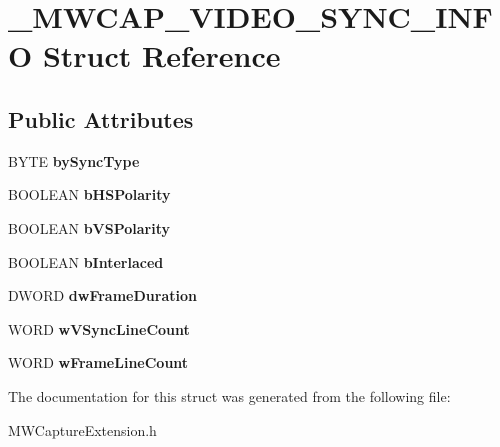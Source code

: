 \hypertarget{struct__MWCAP__VIDEO__SYNC__INFO}{\section{\-\_\-\-M\-W\-C\-A\-P\-\_\-\-V\-I\-D\-E\-O\-\_\-\-S\-Y\-N\-C\-\_\-\-I\-N\-F\-O Struct Reference}
\label{struct__MWCAP__VIDEO__SYNC__INFO}
}
\subsection*{Public Attributes}
\begin{DoxyCompactItemize}
\item 
\hypertarget{struct__MWCAP__VIDEO__SYNC__INFO_a05fc013c3622fb946e5e0eea1f09af20}{B\-Y\-T\-E {\bfseries by\-Sync\-Type}}\label{struct__MWCAP__VIDEO__SYNC__INFO_a05fc013c3622fb946e5e0eea1f09af20}

\item 
\hypertarget{struct__MWCAP__VIDEO__SYNC__INFO_ae516ba66555c4a0aae153dee463a2800}{B\-O\-O\-L\-E\-A\-N {\bfseries b\-H\-S\-Polarity}}\label{struct__MWCAP__VIDEO__SYNC__INFO_ae516ba66555c4a0aae153dee463a2800}

\item 
\hypertarget{struct__MWCAP__VIDEO__SYNC__INFO_a3ed08059458408c8770cb0470eecd0d7}{B\-O\-O\-L\-E\-A\-N {\bfseries b\-V\-S\-Polarity}}\label{struct__MWCAP__VIDEO__SYNC__INFO_a3ed08059458408c8770cb0470eecd0d7}

\item 
\hypertarget{struct__MWCAP__VIDEO__SYNC__INFO_a46d5e9f06af8f2b5c324e8c21becc6bf}{B\-O\-O\-L\-E\-A\-N {\bfseries b\-Interlaced}}\label{struct__MWCAP__VIDEO__SYNC__INFO_a46d5e9f06af8f2b5c324e8c21becc6bf}

\item 
\hypertarget{struct__MWCAP__VIDEO__SYNC__INFO_adc5d2cdbbe9ae8cfd8a1c973cbde6a6c}{D\-W\-O\-R\-D {\bfseries dw\-Frame\-Duration}}\label{struct__MWCAP__VIDEO__SYNC__INFO_adc5d2cdbbe9ae8cfd8a1c973cbde6a6c}

\item 
\hypertarget{struct__MWCAP__VIDEO__SYNC__INFO_a828e48943521d132cd3ff7ff5034c7e7}{W\-O\-R\-D {\bfseries w\-V\-Sync\-Line\-Count}}\label{struct__MWCAP__VIDEO__SYNC__INFO_a828e48943521d132cd3ff7ff5034c7e7}

\item 
\hypertarget{struct__MWCAP__VIDEO__SYNC__INFO_a61cec64650b303bfec66fe42cf269fe9}{W\-O\-R\-D {\bfseries w\-Frame\-Line\-Count}}\label{struct__MWCAP__VIDEO__SYNC__INFO_a61cec64650b303bfec66fe42cf269fe9}

\end{DoxyCompactItemize}


The documentation for this struct was generated from the following file\-:\begin{DoxyCompactItemize}
\item 
M\-W\-Capture\-Extension.\-h\end{DoxyCompactItemize}
